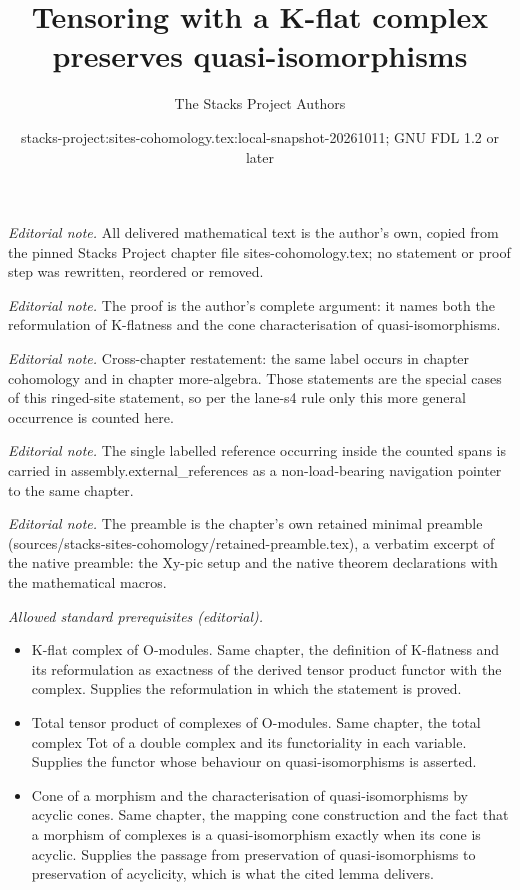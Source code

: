 \documentclass[10pt,a4paper]{amsart}
\title{Tensoring with a K-flat complex preserves quasi-isomorphisms}
\author{The Stacks Project Authors}
\date{stacks-project:sites-cohomology.tex:local-snapshot-20261011; GNU FDL 1.2 or later}
\theoremstyle{plain}
\theoremstyle{definition}
\theoremstyle{remark}
\numberwithin{equation}{subsection}
\begin{document}
\maketitle
\noindent\textit{Editorial note.} All delivered mathematical text is the author's own, copied from the pinned Stacks Project chapter file sites-cohomology.tex; no statement or proof step was rewritten, reordered or removed.\par\medskip
\noindent\textit{Editorial note.} The proof is the author's complete argument: it names both the reformulation of K-flatness and the cone characterisation of quasi-isomorphisms.\par\medskip
\noindent\textit{Editorial note.} Cross-chapter restatement: the same label occurs in chapter cohomology and in chapter more-algebra. Those statements are the special cases of this ringed-site statement, so per the lane-s4 rule only this more general occurrence is counted here.\par\medskip
\noindent\textit{Editorial note.} The single labelled reference occurring inside the counted spans is carried in assembly.external\_references as a non-load-bearing navigation pointer to the same chapter.\par\medskip
\noindent\textit{Editorial note.} The preamble is the chapter's own retained minimal preamble (sources/stacks-sites-cohomology/retained-preamble.tex), a verbatim excerpt of the native preamble: the Xy-pic setup and the native theorem declarations with the mathematical macros.\par\medskip
\noindent\textit{Allowed standard prerequisites (editorial).}\begin{itemize}
\item K-flat complex of O-modules. Same chapter, the definition of K-flatness and its reformulation as exactness of the derived tensor product functor with the complex. Supplies the reformulation in which the statement is proved.
\item Total tensor product of complexes of O-modules. Same chapter, the total complex Tot of a double complex and its functoriality in each variable. Supplies the functor whose behaviour on quasi-isomorphisms is asserted.
\item Cone of a morphism and the characterisation of quasi-isomorphisms by acyclic cones. Same chapter, the mapping cone construction and the fact that a morphism of complexes is a quasi-isomorphism exactly when its cone is acyclic. Supplies the passage from preservation of quasi-isomorphisms to preservation of acyclicity, which is what the cited lemma delivers.
\end{itemize}\medskip
\end{document}
